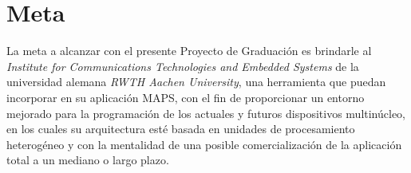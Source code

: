 
\chapter{Meta}
\label{ch:Meta}

La meta a alcanzar con el presente Proyecto de Graduación es brindarle 
al \textit{Institute for Communications Technologies and Embedded Systems}
de la universidad alemana \textit{RWTH Aachen University}, una herramienta 
que puedan incorporar en su aplicación MAPS, con el fin de proporcionar 
un entorno mejorado para la programación de los actuales y futuros dispositivos 
multinúcleo, en los cuales su arquitectura esté basada en unidades de procesamiento
heterogéneo y con la mentalidad de una posible comercialización de la aplicación 
total a un mediano o largo plazo.

